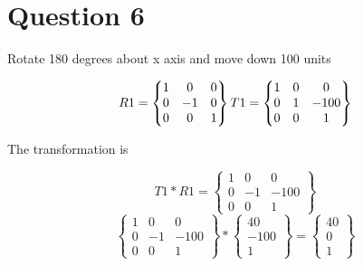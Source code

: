 \documentclass{article}
\begin{document}
	\pagebreak
	\section{Question 6}
	\begin{center}
		Rotate 180 degrees about x axis and move down 100 units
	\end{center}		
	
	\[
	R1 = 
	\begin{Bmatrix}
		1 & 0 & 0 \\
		0 & -1 & 0 \\
		0 & 0 & 1
	\end{Bmatrix}
	\\
	T1 = 
	\begin{Bmatrix}
		1 & 0 & 0 \\
		0 & 1 & -100 \\
		0 & 0 & 1
	\end{Bmatrix}
	\]
	
	\begin{center}
		The transformation is
	\end{center}
	\[
		T1 * R1 =
		\begin{Bmatrix}
		1 & 0 & 0 \\
		0 & -1 & -100 \\
		0 & 0 & 1
		\end{Bmatrix}
	\]
	\[
		\begin{Bmatrix}
		1 & 0 & 0 \\
		0 & -1 & -100 \\
		0 & 0 & 1
		\end{Bmatrix}
		*
		\begin{Bmatrix}
		40 \\
		-100 \\
		1
		\end{Bmatrix}
		=
		\begin{Bmatrix}
		40 \\
		0 \\
		1
		\end{Bmatrix}
	\]
\end{document}
